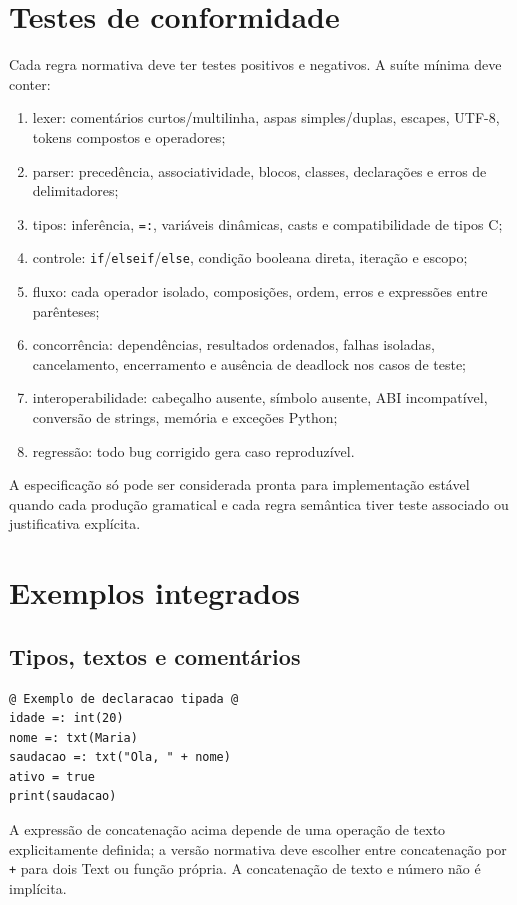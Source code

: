 \documentclass[12pt,a4paper]{article}
\begin{document}
\section{Testes de conformidade}
Cada regra normativa deve ter testes positivos e negativos. A suíte mínima deve conter:
\begin{enumerate}
\item lexer: comentários curtos/multilinha, aspas simples/duplas, escapes, UTF-8, tokens compostos e operadores;
\item parser: precedência, associatividade, blocos, classes, declarações e erros de delimitadores;
\item tipos: inferência, \texttt{=:}, variáveis dinâmicas, casts e compatibilidade de tipos C;
\item controle: \texttt{if}/\texttt{elseif}/\texttt{else}, condição booleana direta, iteração e escopo;
\item fluxo: cada operador isolado, composições, ordem, erros e expressões entre parênteses;
\item concorrência: dependências, resultados ordenados, falhas isoladas, cancelamento, encerramento e ausência de deadlock nos casos de teste;
\item interoperabilidade: cabeçalho ausente, símbolo ausente, ABI incompatível, conversão de strings, memória e exceções Python;
\item regressão: todo bug corrigido gera caso reproduzível.
\end{enumerate}
A especificação só pode ser considerada pronta para implementação estável quando cada produção gramatical e cada regra semântica tiver teste associado ou justificativa explícita.
\section{Exemplos integrados}
\subsection{Tipos, textos e comentários}
\begin{lstlisting}
@ Exemplo de declaracao tipada @
idade =: int(20)
nome =: txt(Maria)
saudacao =: txt("Ola, " + nome)
ativo = true
print(saudacao)
\end{lstlisting}
A expressão de concatenação acima depende de uma operação de texto explicitamente definida; a versão normativa deve escolher entre concatenação por \texttt{+} para dois Text ou função própria. A concatenação de texto e número não é implícita.
\end{document}
